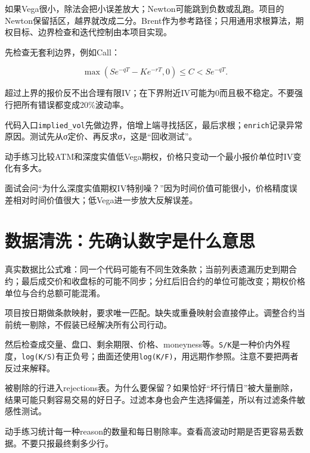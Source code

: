 \documentclass[UTF8,11pt,a4paper]{ctexart}
\begin{document}
如果Vega很小，除法会把小误差放大；Newton可能跳到负数或乱跑。项目的Newton保留括区，越界就改成二分。Brent作为参考路径；只用通用求根算法，期权目标、边界检查和迭代控制由本项目实现。

先检查无套利边界，例如Call：

\[
\max(Se^{-qT}-Ke^{-rT},0)\le C < Se^{-qT}.
\]

超过上界的报价反不出合理有限IV；在下界附近IV可能为0而且极不稳定。不要强行把所有错误都变成20\%波动率。

\begin{learningbox}{代码入口}\texttt{implied\_vol}先做边界，倍增上端寻找括区，最后求根；\texttt{enrich}记录异常原因。测试先从σ定价、再反求σ，这是“回收测试”。\end{learningbox}

\begin{learningbox}{动手练习}比较ATM和深度实值低Vega期权，价格只变动一个最小报价单位时IV变化有多大。\end{learningbox}

\begin{learningbox}{面试会问}“为什么深度实值期权IV特别噪？”因为时间价值可能很小，价格精度误差相对时间价值很大；低Vega进一步放大反解误差。\end{learningbox}


\section{数据清洗：先确认数字是什么意思}

真实数据比公式难：同一个代码可能有不同生效条款；当前列表遗漏历史到期合约；最后成交价和收盘标的可能不同步；分红后旧合约的单位可能改变；期权价格单位与合约总额可能混淆。

项目按日期做条款映射，要求唯一匹配。缺失或重叠映射会直接停止。调整合约当前统一剔除，不假装已经解决所有公司行动。

然后检查成交量、盘口、剩余期限、价格、moneyness等。\texttt{S/K}是一种价内外程度，\texttt{log(K/S)}有正负号；曲面还使用\texttt{log(K/F)}，用远期作参照。注意不要把两者反过来解释。

被剔除的行进入rejections表。为什么要保留？如果恰好“坏行情日”被大量删除，结果可能只剩容易交易的好日子。过滤本身也会产生选择偏差，所以有过滤条件敏感性测试。

\begin{learningbox}{动手练习}统计每一种reason的数量和每日剔除率。查看高波动时期是否更容易丢数据。不要只报最终剩多少行。\end{learningbox}
\end{document}

